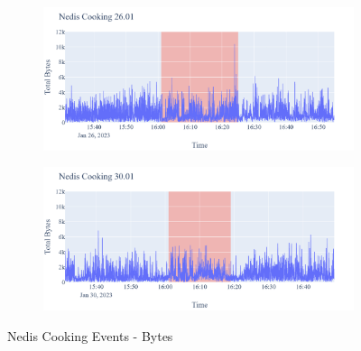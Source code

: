 \begin{figure}[H]
\begin{subfigure}[b]{0.47\textwidth}
        \centering
        \includegraphics[width=1.2\hsize]{figures/Nedis_Cooking_Bytes_26.01.png}
    \end{subfigure}
    \hspace{0.6cm}
    \begin{subfigure}[b]{0.47\textwidth}
        \centering
        \includegraphics[width=1.2\hsize]{figures/Nedis_Cooking_Bytes_30.01.png}
    \end{subfigure}
    \caption{Nedis Cooking Events - Bytes}
    \label{fig:NedisCookingBytes}
\end{figure}

